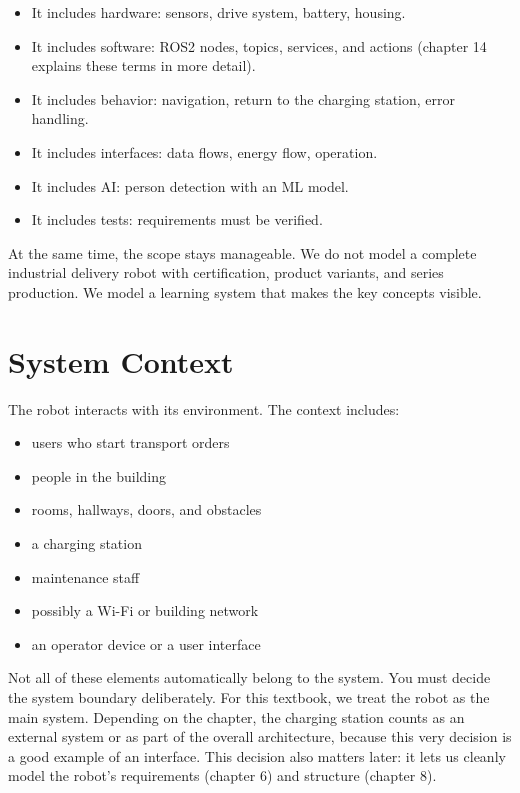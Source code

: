 \begin{itemize}
    \item It includes hardware: sensors, drive system, battery, housing.
    \item It includes software: ROS2 nodes, topics, services, and actions (chapter 14 explains these terms in more detail).
    \item It includes behavior: navigation, return to the charging station, error handling.
    \item It includes interfaces: data flows, energy flow, operation.
    \item It includes AI: person detection with an ML model.
    \item It includes tests: requirements must be verified.
\end{itemize}

At the same time, the scope stays manageable. We do not model a complete industrial delivery robot with certification, product variants, and series production. We model a learning system that makes the key concepts visible.

\section{System Context}
The robot interacts with its environment. The context includes:

\begin{itemize}
    \item users who start transport orders
    \item people in the building
    \item rooms, hallways, doors, and obstacles
    \item a charging station
    \item maintenance staff
    \item possibly a Wi-Fi or building network
    \item an operator device or a user interface
\end{itemize}

Not all of these elements automatically belong to the system. You must decide the system boundary deliberately. For this textbook, we treat the robot as the main system. Depending on the chapter, the charging station counts as an external system or as part of the overall architecture, because this very decision is a good example of an interface. This decision also matters later: it lets us cleanly model the robot's requirements (chapter 6) and structure (chapter 8).

